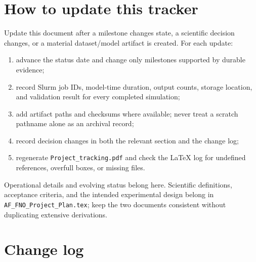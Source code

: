 \documentclass[11pt]{article}
\begin{document}
\section{How to update this tracker}

Update this document after a milestone changes state, a scientific decision changes,
or a material dataset/model artifact is created.  For each update:

\begin{enumerate}
\item advance the status date and change only milestones supported by durable evidence;
\item record Slurm job IDs, model-time duration, output counts, storage location, and
  validation result for every completed simulation;
\item add artifact paths and checksums where available; never treat a scratch pathname
  alone as an archival record;
\item record decision changes in both the relevant section and the change log;
\item regenerate \texttt{Project\_tracking.pdf} and check the LaTeX log for undefined
  references, overfull boxes, or missing files.
\end{enumerate}

Operational details and evolving status belong here.  Scientific definitions,
acceptance criteria, and the intended experimental design belong in
\texttt{AF\_FNO\_Project\_Plan.tex}; keep the two documents consistent without
duplicating extensive derivations.

\section{Change log}
\end{document}

